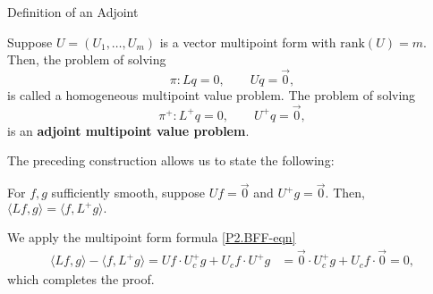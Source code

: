 \documentclass[serif, final, noamsthm]{beamer} %
\newenvironment{proof}[1][Proof.]{\begin{trivlist}
\item[\hskip \labelsep {\bfseries #1}]}{\end{trivlist}}
\begin{document}
\begin{center}
\begin{frame}
\begin{columns}[t]
{\begin{block}{Definition of an Adjoint}
\begin{defn}
Suppose $U = (U_1, \ldots, U_m)$ is a vector multipoint form with $\mathrm{rank}(U) = m.$ Then, the problem of solving 
\[ \pi: Lq = 0, \qquad Uq = \vec{0},\] 
is called a homogeneous multipoint value problem. The problem of solving 
\[ \pi^+: L^+q = 0, \qquad U^+q = \vec{0},\] 
is an \textbf{adjoint multipoint value problem}. 
\end{defn}
The preceding construction allows us to state the following:

\begin{prop}
For $f,g$ sufficiently smooth, suppose $Uf = \vec{0}$ and $U^+g = \vec{0}.$ Then, $\langle Lf, g\rangle = \langle f, L^+g\rangle.$
\end{prop}

\begin{proof}
We apply the multipoint form formula \eqref{P2.BFF-eqn}
\begin{align*}
\langle Lf, g\rangle - \langle f, L^+g\rangle = Uf\cdot U^+_c g + U_c f \cdot U^+ g &= \vec{0}\cdot U^+_c g + U_c f \cdot \vec{0} = 0,
\end{align*} 
which completes the proof.
\end{proof}
\end{block}
          
}
\end{columns}
\end{frame}
\end{center}
\end{document}
